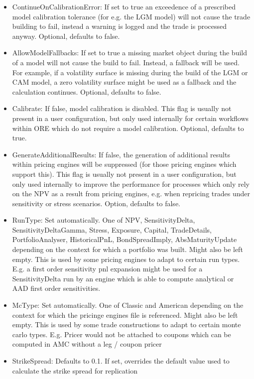 \begin{itemize}
\item ContinueOnCalibrationError: If set to true an exceedence of a prescribed model calibration tolerance (for e.g. the
  LGM model) will not cause the trade building to fail, instead a warning is logged and the trade is processed
  anyway. Optional, defaults to false.
\item AllowModelFallbacks: If set to true a missing market object during the build of a model will not cause the build
  to fail. Instead, a fallback will be used. For example, if a volatility surface is missing during the build of the LGM
  or CAM model, a zero volatility surface might be used as a fallback and the calculation continues. Optional, defaults
  to false.
\item Calibrate: If false, model calibration is disabled. This flag is usually not present in a user configuration, but
  only used internally for certain workflows within ORE which do not require a model calibration. Optional, defaults to
  true.
\item GenerateAdditionalResults: If false, the generation of additional results within pricing engines will be
  suppressed (for those pricing engines which support this). This flag is usually not present in a user configuration,
  but only used internally to improve the performance for processes which only rely on the NPV as a result from pricing
  engines, e.g. when repricing trades under sensitivity or stress scenarios. Option, defaults to false.
\item RunType: Set automatically. One of NPV, SensitivityDelta, SensitivityDeltaGamma, Stress, Exposure, Capital,
  TradeDetails, PortfolioAnalyser, HistoricalPnL, BondSpreadImply, AbsMaturityUpdate depending on the context for which
  a portfolio was built. Might also be left empty. This is used by some pricing engines to adapt to certain run
  types. E.g. a first order sensitivity pnl expansion might be used for a SensitivityDelta run by an engine which is
  able to compute analytical or AAD first order sensitivities.
\item McType: Set automatically. One of Classic and American depending on the context for which the pricinge engines
  file is referenced. Might also be left empty. This is used by some trade constructions to adapt to certain monte carlo
  types. E.g. Pricer would not be attached to coupons which can be computed in AMC without a leg / coupon pricer
\item StrikeSpread: Defaults to 0.1. If set, overrides the default value used to calculate the strike spread for replication 

\end{itemize}
